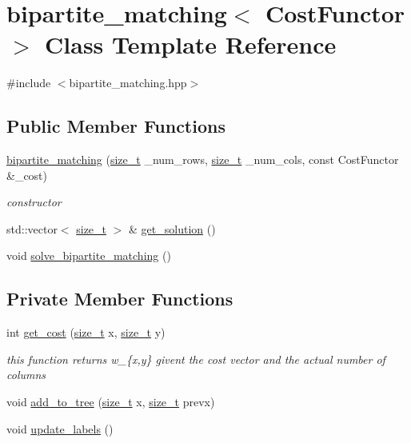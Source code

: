 \hypertarget{classbipartite__matching}{}\section{bipartite\+\_\+matching$<$ Cost\+Functor $>$ Class Template Reference}
\label{classbipartite__matching}


{\ttfamily \#include $<$bipartite\+\_\+matching.\+hpp$>$}

\subsection*{Public Member Functions}
\begin{DoxyCompactItemize}
\item 
\hyperlink{classbipartite__matching_a8feb206f6dea673e60db02054e3cc600}{bipartite\+\_\+matching} (\hyperlink{tutorial__fpt__2017_2intro_2sixth_2test_8c_a7c94ea6f8948649f8d181ae55911eeaf}{size\+\_\+t} \+\_\+num\+\_\+rows, \hyperlink{tutorial__fpt__2017_2intro_2sixth_2test_8c_a7c94ea6f8948649f8d181ae55911eeaf}{size\+\_\+t} \+\_\+num\+\_\+cols, const Cost\+Functor \&\+\_\+cost)
\begin{DoxyCompactList}\small\item\em constructor \end{DoxyCompactList}\item 
std\+::vector$<$ \hyperlink{tutorial__fpt__2017_2intro_2sixth_2test_8c_a7c94ea6f8948649f8d181ae55911eeaf}{size\+\_\+t} $>$ \& \hyperlink{classbipartite__matching_a51acadff82a7c5fc203dc401c4652223}{get\+\_\+solution} ()
\item 
void \hyperlink{classbipartite__matching_adaa99c992790423e6ecc95f8ac8bafe6}{solve\+\_\+bipartite\+\_\+matching} ()
\end{DoxyCompactItemize}
\subsection*{Private Member Functions}
\begin{DoxyCompactItemize}
\item 
int \hyperlink{classbipartite__matching_a7599b38138e3978176b4e12338e4eba3}{get\+\_\+cost} (\hyperlink{tutorial__fpt__2017_2intro_2sixth_2test_8c_a7c94ea6f8948649f8d181ae55911eeaf}{size\+\_\+t} x, \hyperlink{tutorial__fpt__2017_2intro_2sixth_2test_8c_a7c94ea6f8948649f8d181ae55911eeaf}{size\+\_\+t} y)
\begin{DoxyCompactList}\small\item\em this function returns w\+\_\+\{x,y\} givent the cost vector and the actual number of columns \end{DoxyCompactList}\item 
void \hyperlink{classbipartite__matching_a7c38ddd8d6f908213c184a094a79d860}{add\+\_\+to\+\_\+tree} (\hyperlink{tutorial__fpt__2017_2intro_2sixth_2test_8c_a7c94ea6f8948649f8d181ae55911eeaf}{size\+\_\+t} x, \hyperlink{tutorial__fpt__2017_2intro_2sixth_2test_8c_a7c94ea6f8948649f8d181ae55911eeaf}{size\+\_\+t} prevx)
\item 
void \hyperlink{classbipartite__matching_aa94d912ea3ad5f029cc94cb0495826a0}{update\+\_\+labels} ()
\end{DoxyCompactItemize}
